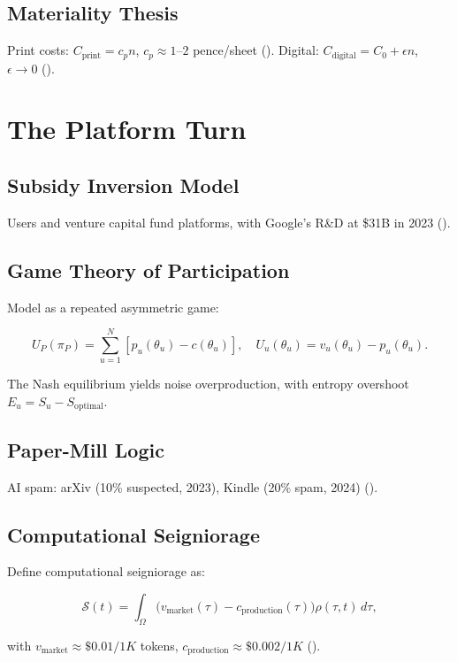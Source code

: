\documentclass[12pt]{article}
\begin{document}
\subsection{Materiality Thesis}

Print costs: \(C_{\text{print}} = c_p n\), \(c_p \approx 1–2\) pence/sheet (\citealp{Johns1998}). Digital: \(C_{\text{digital}} = C_0 + \epsilon n\), \(\epsilon \to 0\) (\citealp{Kittler1999}).

\section{The Platform Turn}

\subsection{Subsidy Inversion Model}

Users and venture capital fund platforms, with Google’s R&D at \$31B in 2023 (\citealp{Doctorow2023}).

\subsection{Game Theory of Participation}

Model as a repeated asymmetric game:

\[
U_P(\pi_P) = \sum_{u=1}^N [p_u(\theta_u) - c(\theta_u)], \quad U_u(\theta_u) = v_u(\theta_u) - p_u(\theta_u).
\]

The Nash equilibrium yields noise overproduction, with entropy overshoot \(E_u = S_u - S_{\text{optimal}}\).

\subsection{Paper-Mill Logic}

AI spam: arXiv (10\% suspected, 2023), Kindle (20\% spam, 2024) (\citealp{Zitron2024}).

\subsection{Computational Seigniorage}

Define computational seigniorage as:

\[
\mathcal{S}(t) = \int_{\Omega} \big( v_{\text{market}}(\tau) - c_{\text{production}}(\tau) \big) \rho(\tau, t) \, d\tau,
\]

with \(v_{\text{market}} \approx \$0.01/1K\) tokens, \(c_{\text{production}} \approx \$0.002/1K\) (\citealp{OpenAI2025}).
\end{document}
